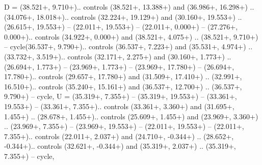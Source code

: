 {D} = {(38.521+\ctpXshift, 9.710+\ctpYshift).. controls (38.521+\ctpXshift, 13.388+\ctpYshift) and (36.986+\ctpXshift, 16.298+\ctpYshift) .. (34.076+\ctpXshift, 18.018+\ctpYshift).. controls (32.224+\ctpXshift, 19.129+\ctpYshift) and (30.160+\ctpXshift, 19.553+\ctpYshift) .. (26.615+\ctpXshift, 19.553+\ctpYshift) -- (22.011+\ctpXshift, 19.553+\ctpYshift) -- (22.011+\ctpXshift, 0.000+\ctpYshift) -- (27.276+\ctpXshift, 0.000+\ctpYshift).. controls (34.922+\ctpXshift, 0.000+\ctpYshift) and (38.521+\ctpXshift, 4.075+\ctpYshift) .. (38.521+\ctpXshift, 9.710+\ctpYshift) -- cycle(36.537+\ctpXshift, 9.790+\ctpYshift).. controls (36.537+\ctpXshift, 7.223+\ctpYshift) and (35.531+\ctpXshift, 4.974+\ctpYshift) .. (33.732+\ctpXshift, 3.519+\ctpYshift).. controls (32.171+\ctpXshift, 2.275+\ctpYshift) and (30.160+\ctpXshift, 1.773+\ctpYshift) .. (26.694+\ctpXshift, 1.773+\ctpYshift) -- (23.969+\ctpXshift, 1.773+\ctpYshift) -- (23.969+\ctpXshift, 17.780+\ctpYshift) -- (26.694+\ctpXshift, 17.780+\ctpYshift).. controls (29.657+\ctpXshift, 17.780+\ctpYshift) and (31.509+\ctpXshift, 17.410+\ctpYshift) .. (32.991+\ctpXshift, 16.510+\ctpYshift).. controls (35.240+\ctpXshift, 15.161+\ctpYshift) and (36.537+\ctpXshift, 12.700+\ctpYshift) .. (36.537+\ctpXshift, 9.790+\ctpYshift) -- cycle},
{U} = {(35.319+\ctpXshift, 7.355+\ctpYshift) -- (35.319+\ctpXshift, 19.553+\ctpYshift) -- (33.361+\ctpXshift, 19.553+\ctpYshift) -- (33.361+\ctpXshift, 7.355+\ctpYshift).. controls (33.361+\ctpXshift, 3.360+\ctpYshift) and (31.695+\ctpXshift, 1.455+\ctpYshift) .. (28.678+\ctpXshift, 1.455+\ctpYshift).. controls (25.609+\ctpXshift, 1.455+\ctpYshift) and (23.969+\ctpXshift, 3.360+\ctpYshift) .. (23.969+\ctpXshift, 7.355+\ctpYshift) -- (23.969+\ctpXshift, 19.553+\ctpYshift) -- (22.011+\ctpXshift, 19.553+\ctpYshift) -- (22.011+\ctpXshift, 7.355+\ctpYshift).. controls (22.011+\ctpXshift, 2.037+\ctpYshift) and (24.710+\ctpXshift, -0.344+\ctpYshift) .. (28.652+\ctpXshift, -0.344+\ctpYshift).. controls (32.621+\ctpXshift, -0.344+\ctpYshift) and (35.319+\ctpXshift, 2.037+\ctpYshift) .. (35.319+\ctpXshift, 7.355+\ctpYshift) -- cycle},
